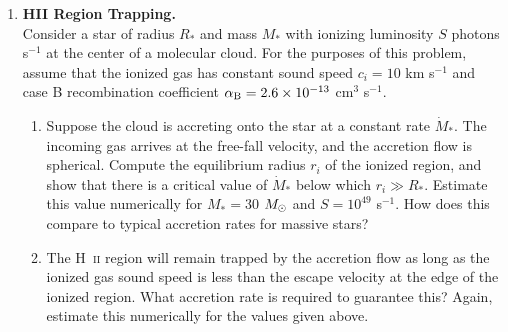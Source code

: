\problemset

\begin{enumerate}

\item {\bf HII Region Trapping.}\\
Consider a star of radius $R_*$ and mass $M_*$ with ionizing luminosity $S$ photons s$^{-1}$ at the center of a molecular cloud. For the purposes of this problem, assume that the ionized gas has constant sound speed $c_i=10$ km s$^{-1}$ and case B recombination coefficient $\alpha_{\mathrm{B}}=2.6\times 10^{-13}$ cm$^{3}$ s$^{-1}$.
\begin{enumerate}
\item Suppose the cloud is accreting onto the star at a constant rate $\dot{M}_*$. The incoming gas arrives at the free-fall velocity, and the accretion flow is spherical. Compute the equilibrium radius $r_i$ of the ionized region, and show that there is a critical value of $\dot{M}_*$ below which $r_i \gg R_*$. Estimate this value numerically for $M_*=30$ $M_{\odot}$ and $S=10^{49}$ s$^{-1}$. How does this compare to typical accretion rates for massive stars?
\item The H~\textsc{ii} region will remain trapped by the accretion flow as long as the ionized gas sound speed is less than the escape velocity at the edge of the ionized region. What accretion rate is required to guarantee this? Again, estimate this numerically for the values given above.\\
\end{enumerate}


\end{enumerate}
